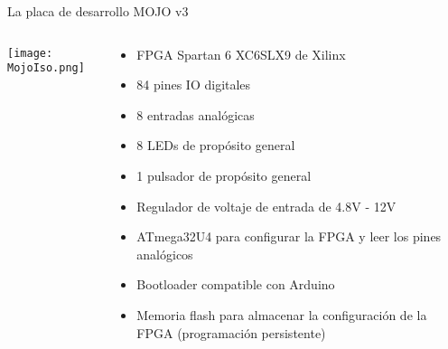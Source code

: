 \begin{frame}{La placa de desarrollo MOJO v3}
	\begin{columns}
		\begin{column}{.43\textwidth}
			\texttt{[image: MojoIso.png]}
		\end{column}
		\begin{column}{.55\textwidth}
			\begin{itemize}
				\item FPGA Spartan 6 XC6SLX9 de Xilinx
				\item 84 pines IO digitales
				\item 8 entradas analógicas
				\item 8 LEDs de propósito general
				\item 1 pulsador de propósito general
				\item Regulador de voltaje de entrada de 4.8V - 12V
				\item ATmega32U4 para configurar la FPGA y leer los pines analógicos
				\item Bootloader compatible con Arduino
				\item Memoria flash para almacenar la configuración de la FPGA (programación persistente)
			\end{itemize}
		\end{column}
	\end{columns}
\end{frame}
%			
